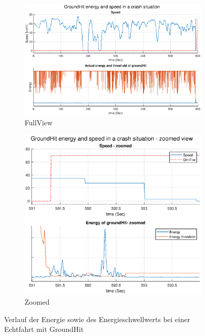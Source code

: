 \begin{figure}[H]
	\centering
	\begin{subfigure}{0.58\textwidth}
		\centering
		\includegraphics[width=\textwidth]{Bilder/GH_speed_GHEnergy_MitGH_FullView_eps.eps}
		\caption{FullView}
		\label{fig:GH_speed_GHEnergy_MitGH_FullView_eps}
	\end{subfigure}
	\hfill
	\begin{subfigure}{0.41\textwidth}
		\centering
		\includegraphics[width=\textwidth]{Bilder/GH_speed_GHEnergy_MitGH_zoomed_eps.eps}
		\caption{Zoomed}
		\label{fig:GH_speed_GHEnergy_MitGH_zoomed_eps}
	\end{subfigure}
	\caption{Verlauf der Energie sowie des Energieschwellwerts bei einer Echtfahrt mit GroundHit}
	\label{fig:RealcrashID_2806_EnergyZoomed_MitGroundHit}
\end{figure}



